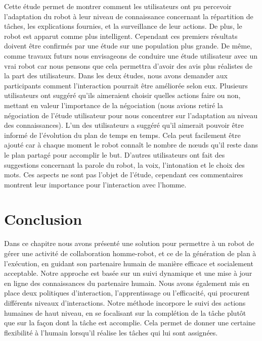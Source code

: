 \documentclass[a4paper,11pt,twoside]{StyleThese}
\begin{document}
Cette étude permet de montrer comment les utilisateurs ont pu percevoir l'adaptation du robot à leur niveau de connaissance concernant la répartition de tâches, les explications fournies, et la surveillance de leur actions. De plus, le robot est apparut comme plus intelligent. Cependant ces premiers résultats doivent être confirmés par une étude sur une population plus grande. De même, comme travaux futurs nous envisageons de conduire une étude utilisateur avec un vrai robot car nous pensons que cela permettra d'avoir des avis plus réalistes de la part des utilisateurs.
Dans les deux études, nous avons demander aux participants comment l'interaction pourrait être améliorée selon eux.
Plusieurs utilisateurs ont suggéré qu'ils aimeraient choisir quelles actions faire ou non, mettant en valeur l'importance de la négociation (nous avions retiré la négociation de l'étude utilisateur pour nous concentrer sur l'adaptation au niveau des connaissances). L'un des utilisateurs a suggéré qu'il aimerait pouvoir être informé de l'évolution du plan de temps en temps. 
Cela peut facilement être ajouté car à chaque moment le robot connaît le nombre de nœuds qu'il reste dans le plan partagé pour accomplir le but.
D'autres utilisateurs ont fait des suggestions concernant la parole du robot, la voix, l'intonation et le choix des mots. Ces aspects ne sont pas l'objet de l'étude, cependant ces commentaires montrent leur importance pour l'interaction avec l'homme.

%






\section{Conclusion}
Dans ce chapitre nous avons présenté une solution pour permettre à un robot de gérer une activité de collaboration homme-robot, et ce de la génération de plan à l'exécution, en guidant son partenaire humain de manière efficace et socialement acceptable.
Notre approche est basée sur un suivi dynamique et une mise à jour en ligne des connaissances du partenaire humain. 
Nous avons également mis en place deux politiques d'interaction, l'apprentissage ou l'efficacité, qui procurent différents niveaux d'interactions. 
Notre méthode incorpore le suivi des actions humaines de haut niveau, en se focalisant sur la complétion de la tâche plutôt que sur la façon dont la tâche est accomplie. Cela permet de donner une certaine flexibilité à l'humain lorsqu'il réalise les tâches qui lui sont assignées.
\end{document}

